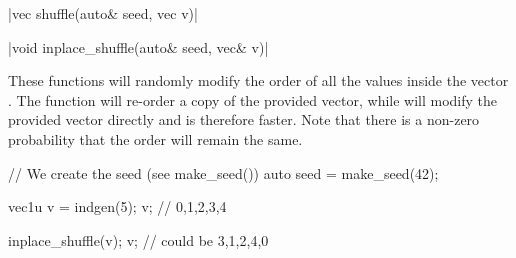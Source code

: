 \funcitem \cppinline|vec shuffle(auto& seed, vec v)| 

\cppinline|void inplace_shuffle(auto& seed, vec& v)| 

These functions will randomly modify the order of all the values inside the vector . The function  will re-order a copy of the provided vector, while  will modify the provided vector directly and is therefore faster. Note that there is a non-zero probability that the order will remain the same.

\begin{example}
\begin{cppcode}
// We create the seed (see make_seed())
auto seed = make_seed(42);

vec1u v = indgen(5);
v; // {0,1,2,3,4}

inplace_shuffle(v);
v; // could be {3,1,2,4,0}
\end{cppcode}
\end{example}
